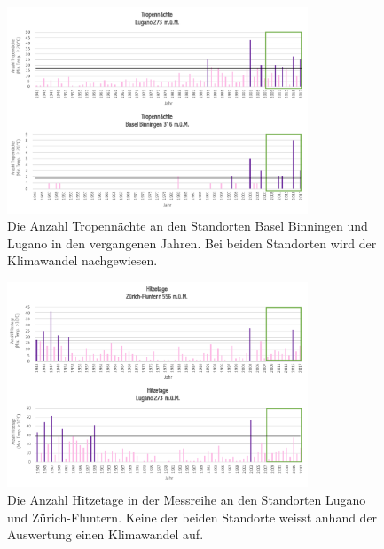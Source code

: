 \begin{refsection}
\begin{figure}
\centering
\includegraphics[width=0.8\textwidth]{extrem/Tropennacht.pdf}
\caption{Die Anzahl Tropennächte an den Standorten Basel Binningen und Lugano in den vergangenen Jahren. Bei beiden Standorten wird der Klimawandel nachgewiesen.}
\label{Tropennacht}
\end{figure}


\begin{figure}
\centering
\includegraphics[width=0.8\textwidth]{extrem/Hitzetage.pdf}
\caption{Die Anzahl Hitzetage in der Messreihe an den Standorten Lugano und Zürich-Fluntern. Keine der beiden Standorte weisst anhand der Auswertung einen Klimawandel auf.}
\label{Hitzetage}
\end{figure}



\end{refsection}
